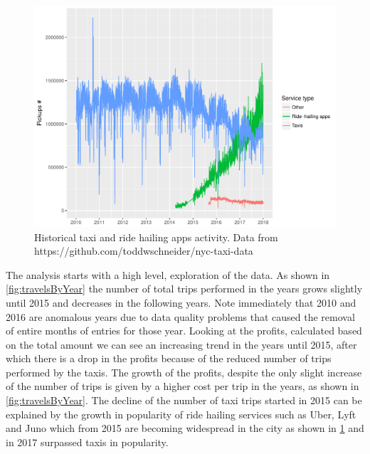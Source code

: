 \documentclass{acm_proc_article-sp-sigmod09}
\begin{document}
\begin{figure}
	\centering
	\includegraphics[width=1\columnwidth]{resources/fhv_vs_taxi.pdf}
	\caption{Historical taxi and ride hailing apps activity. Data from https://github.com/toddwschneider/nyc-taxi-data}
	\label{fig:uberVsTaxis}
\end{figure}

The analysis starts with a high level, exploration of the data. As shown in \cref{fig:travelsByYear} the number of total trips performed in the years grows slightly until 2015 and decreases in the following years. Note immediately that 2010 and 2016 are anomalous years due to data quality problems that caused the removal of entire months of entries for those year. Looking at the profits, calculated based on the total amount we can see an increasing trend in the years until 2015, after which there is a drop in the profits because of the reduced number of trips performed by the taxis. The growth of the profits, despite the only slight increase of the number of trips is given by a higher cost per trip in the years, as shown in \cref{fig:travelsByYear}. The decline of the number of taxi trips started in 2015 can be explained by the growth in popularity of ride hailing services such as Uber, Lyft and Juno which from 2015 are becoming widespread in the city as shown in \cref{fig:uberVsTaxis} and in 2017 surpassed taxis in popularity.
\end{document}
